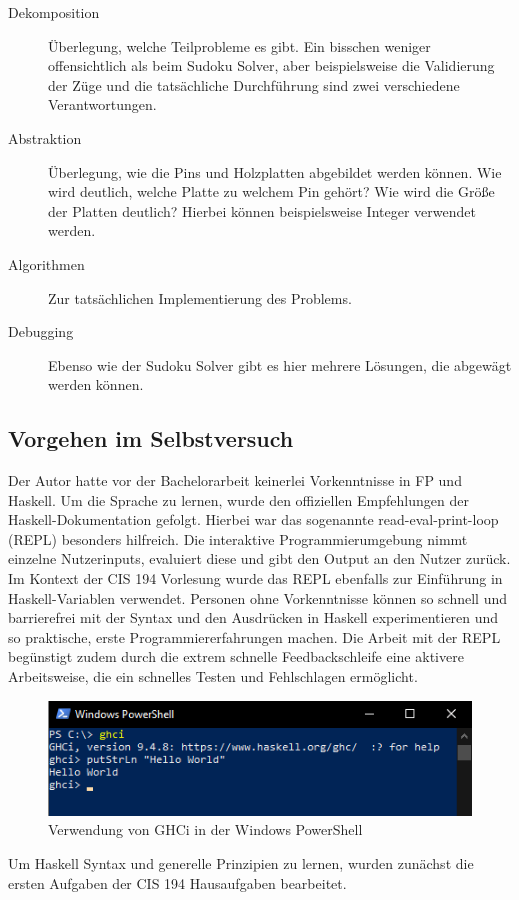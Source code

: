 \begin{description}
    \item[Dekomposition] Überlegung, welche Teilprobleme es gibt. Ein bisschen weniger offensichtlich als beim Sudoku Solver, aber beispielsweise die Validierung der Züge und die tatsächliche Durchführung sind zwei verschiedene Verantwortungen.
    \item[Abstraktion] Überlegung, wie die Pins und Holzplatten abgebildet werden können. Wie wird deutlich, welche Platte zu welchem Pin gehört? Wie wird die Größe der Platten deutlich? Hierbei können beispielsweise Integer verwendet werden.
    \item[Algorithmen] Zur tatsächlichen Implementierung des Problems.
    \item[Debugging] Ebenso wie der Sudoku Solver gibt es hier mehrere Lösungen, die abgewägt werden können.
\end{description}

\subsection{Vorgehen im Selbstversuch}\label{sec:tools_prac}
Der Autor hatte vor der Bachelorarbeit keinerlei Vorkenntnisse in FP und Haskell. Um die Sprache zu lernen, wurde den offiziellen Empfehlungen der Haskell-Dokumentation gefolgt. Hierbei war das sogenannte read-eval-print-loop (REPL) besonders hilfreich. Die interaktive Programmierumgebung nimmt einzelne Nutzerinputs, evaluiert diese und gibt den Output an den Nutzer zurück. Im Kontext der CIS 194 Vorlesung wurde das REPL ebenfalls zur Einführung in Haskell-Variablen verwendet.
Personen ohne Vorkenntnisse können so schnell und barrierefrei mit der Syntax und den Ausdrücken in Haskell experimentieren und so praktische, erste Programmiererfahrungen machen.
Die Arbeit mit der REPL begünstigt zudem durch die extrem schnelle Feedbackschleife eine aktivere Arbeitsweise, die ein schnelles Testen und Fehlschlagen ermöglicht.

\begin{figure}[H]
    \centering
    \includegraphics[width=1\linewidth]{Figures/Anhang/ghci}
    \caption{Verwendung von GHCi in der Windows PowerShell}
\end{figure}

Um Haskell Syntax und generelle Prinzipien zu lernen, wurden zunächst die ersten Aufgaben der CIS 194 Hausaufgaben bearbeitet.